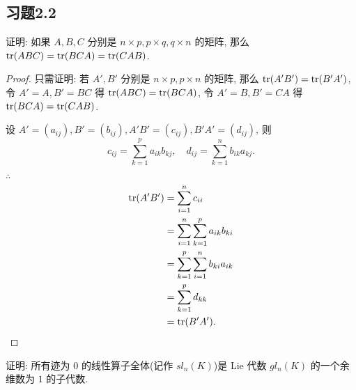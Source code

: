 \documentclass[color=black,device=normal,lang=cn,mode=geye]{elegantnote}
\begin{document}
\subsection{习题2.2}
\begin{exercise}%
    证明: 如果 $A,B,C$ 分别是 $n\times p,p\times q,q\times n$ 的矩阵, 那么 $\operatorname{tr}(ABC)=\operatorname{tr}(BCA)=\operatorname{tr}(CAB)$.
\end{exercise}
\begin{proof}
    只需证明: 若 $A',B'$ 分别是 $n\times p,p\times n$ 的矩阵, 那么 $\operatorname{tr} (A'B')=\operatorname{tr} (B'A')$, 令 $A'=A,B'=BC$ 得 $\operatorname{tr} (ABC)=\operatorname{tr} (BCA)$, 令 $A'=B,B'=CA$ 得 $\operatorname{tr} (BCA)=\operatorname{tr} (CAB)$.

    设 $A'=(a_{ij}),B'=(b_{ij}),A'B'=(c_{ij}),B'A'=(d_{ij})$, 则
    \[c_{ij}=\sum\limits_{k=1}^pa_{ik}b_{kj},\quad d_{ij}=\sum\limits_{k=1}^nb_{ik}a_{kj}.\]

    $\therefore$
    \begin{align*}
        \operatorname{tr} (A'B') & =\sum\limits_{i=1}^nc_{ii} \\
        & =\sum\limits_{i=1}^n\sum\limits_{k=1}^pa_{ik}b_{ki} \\
        & =\sum\limits_{k=1}^p\sum\limits_{i=1}^nb_{ki}a_{ik} \\
        & =\sum\limits_{k=1}^pd_{kk} \\
        & =\operatorname{tr} (B'A').\qedhere
    \end{align*}
\end{proof}
\addtocounter{exercise}{1}
\begin{exercise}%
    证明: 所有迹为 $0$ 的线性算子全体(记作 $sl_n(K)$)是 Lie 代数 $gl_n(K)$ 的一个余维数为 $1$ 的子代数.
\end{exercise}
\end{document}
